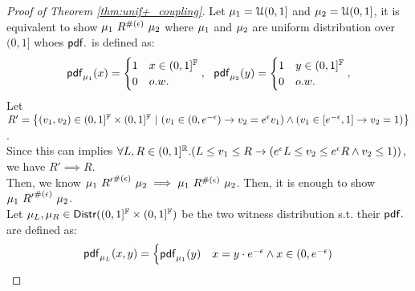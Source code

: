 \documentclass[a4paper,11pt]{article}
\begin{document}
\begin{proof}[Proof of Theorem \ref{thm:unif+_coupling}]
%
Let $\mu_1 = \mathcal{U}(0, 1]$ and $\mu_2 = \mathcal{U}(0, 1]$, it is equivalent to show 
${\mu_1} ~ R^{\#(\epsilon)} ~ \mu_2$
%
where $\mu_1$ and $\mu_2$ are uniform distribution over $(0, 1]$ whoes $\mathsf{pdf}.$ is defined as:
\[
	\mathsf{pdf}_{\mu_1}(x) = 
	\begin{cases}
	1 & x \in (0, 1]^{\mathbb{F}} 
	\\
	0       & o.w.
	\end{cases},
	~~
	\mathsf{pdf}_{\mu_2}(y) = 
	\begin{cases}
	1 & y \in (0, 1]^{\mathbb{F}}
	\\
	0       & o.w.
	\end{cases},
\]
%
Let $R' =
		\left \{(v_1, v_2) \in (0, 1]^{\mathbb{F}} \times (0, 1]^{\mathbb{F}} 
		~|~
		(v_1 \in (0, e^{-\epsilon}) \rightarrow v_2 =  e^{\epsilon}  v_1)
		\land
		(v_1 \in [e^{-\epsilon}, 1] \rightarrow v_2 = 1 )
		\right \}$.
\\
Since this can implies $
\forall L, R \in (0,1]^{\mathbb{R}}. (
L \leq v_1 \leq R
\rightarrow
(e^{\epsilon} L \leq v_2 \leq 	e^{\epsilon} R \land v_2 \leq 1))$,
 we have $R' \implies R$.
%
\\
Then, we know ${\mu_1} ~ {R'}^{\#(\epsilon)} ~ \mu_2
\implies {\mu_1} ~ R^{\#(\epsilon)} ~ \mu_2$.
Then, it is enough to show ${\mu_1} ~ {R'}^{\#(\epsilon)} ~ \mu_2$.
%
\\
%
Let $\mu_L, \mu_R \in \mathsf{Distr}((0,1]^{\mathbb{F}} \times (0,1]^{\mathbb{F}})$ 
be the two witness distribution s.t.
their $\mathsf{pdf}.$ are defined as:
\[
	\mathsf{pdf}_{\mu_L}(x, y) = 
	\begin{cases}
	\mathsf{pdf}_{\mu_1}(y) & x = y \cdot e^{-\epsilon} \land x \in (0, e^{-\epsilon})\\

\end{cases}\]
\end{proof}
\end{document}
